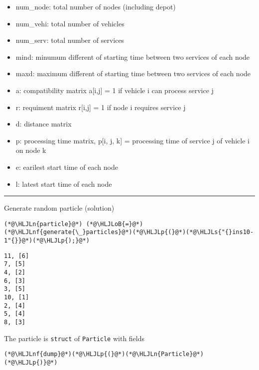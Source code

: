 \documentclass[12pt,a4paper]{article}
\newcommand{\HLJLn}[1]{#1}
\newcommand{\HLJLnf}[1]{\textcolor[RGB]{66,102,213}{#1}}
\newcommand{\HLJLs}[1]{\textcolor[RGB]{201,61,57}{#1}}
\newcommand{\HLJLoB}[1]{\textcolor[RGB]{102,102,102}{\textbf{#1}}}
\newcommand{\HLJLp}[1]{#1}
\begin{document}
\begin{itemize}
\item num\_node: total number of nodes (including depot)


\item num\_vehi: total number of vehicles


\item num\_serv: total number of services


\item mind: minumum different of starting time between two services of each node


\item maxd: maximum different of starting time between two services of each node


\item a: compatibility matrix a[i,j] = 1 if vehicle i can process service j


\item r: requiment matrix r[i,j] = 1 if node i requires service j


\item d: distance matrix


\item p: processing time matrix, p[i, j, k] = processing time of service j of vehicle i on node k


\item e: earilest start time of each node


\item l: latest start time of each node

\end{itemize}
\rule{\textwidth}{1pt}
Generate random particle (solution)


\begin{lstlisting}
(*@\HLJLn{particle}@*) (*@\HLJLoB{=}@*) (*@\HLJLnf{generate{\_}particles}@*)(*@\HLJLp{(}@*)(*@\HLJLs{"{}ins10-1"{}}@*)(*@\HLJLp{);}@*)
\end{lstlisting}

\begin{lstlisting}
11, [6]
7, [5]
4, [2]
6, [3]
3, [5]
10, [1]
2, [4]
5, [4]
8, [3]
\end{lstlisting}


The particle is \texttt{struct} of \texttt{Particle} with fields


\begin{lstlisting}
(*@\HLJLnf{dump}@*)(*@\HLJLp{(}@*)(*@\HLJLn{Particle}@*)(*@\HLJLp{)}@*)
\end{lstlisting}
\end{document}

